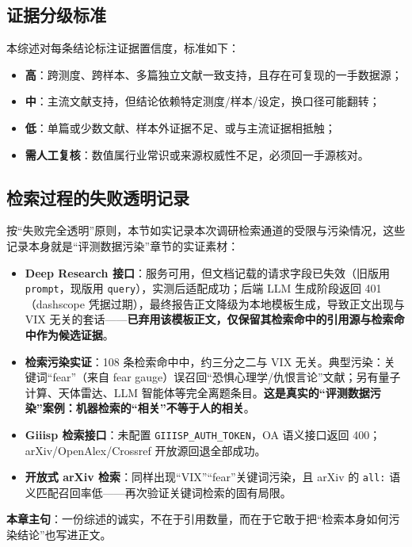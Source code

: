 \documentclass[11pt,a4paper]{article}
\begin{document}
\subsection{证据分级标准}

本综述对每条结论标注证据置信度，标准如下：

\begin{itemize}[leftmargin=2.2em]
  \item \textbf{高}：跨测度、跨样本、多篇独立文献一致支持，且存在可复现的一手数据源；
  \item \textbf{中}：主流文献支持，但结论依赖特定测度/样本/设定，换口径可能翻转；
  \item \textbf{低}：单篇或少数文献、样本外证据不足、或与主流证据相抵触；
  \item \textbf{需人工复核}：数值属行业常识或来源权威性不足，必须回一手源核对。
\end{itemize}

\subsection{检索过程的失败透明记录}

按“失败完全透明”原则，本节如实记录本次调研检索通道的受限与污染情况，这些记录本身就是“评测数据污染”章节的实证素材：

\begin{itemize}[leftmargin=2.2em]
  \item \textbf{Deep Research 接口}：服务可用，但文档记载的请求字段已失效（旧版用 \texttt{prompt}，现版用 \texttt{query}），实测后适配成功；后端 LLM 生成阶段返回 401（dashscope 凭据过期），最终报告正文降级为本地模板生成，导致正文出现与 VIX 无关的套话——\textbf{已弃用该模板正文，仅保留其检索命中的引用源与检索命中作为候选证据}。
  \item \textbf{检索污染实证}：108 条检索命中中，约三分之二与 VIX 无关。典型污染：关键词“fear”（来自 fear gauge）误召回“恐惧心理学/仇恨言论”文献；另有量子计算、天体雷达、LLM 智能体等完全离题条目。\textbf{这是真实的“评测数据污染”案例：机器检索的“相关”不等于人的相关}。
  \item \textbf{Giiisp 检索接口}：未配置 \texttt{GIIISP\_AUTH\_TOKEN}，OA 语义接口返回 400；arXiv/OpenAlex/Crossref 开放源回退全部成功。
  \item \textbf{开放式 arXiv 检索}：同样出现“VIX”“fear”关键词污染，且 arXiv 的 \texttt{all:} 语义匹配召回率低——再次验证关键词检索的固有局限。
\end{itemize}

\textbf{本章主句}：一份综述的诚实，不在于引用数量，而在于它敢于把“检索本身如何污染结论”也写进正文。
\end{document}
